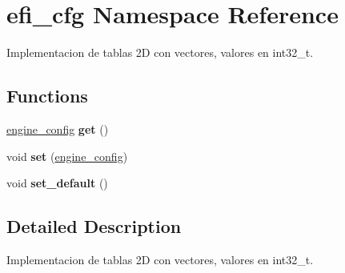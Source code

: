\hypertarget{namespaceefi__cfg}{}\section{efi\+\_\+cfg Namespace Reference}
\label{namespaceefi__cfg}


Implementacion de tablas 2D con vectores, valores en int32\+\_\+t.  


\subsection*{Functions}
\begin{DoxyCompactItemize}
\item 
\mbox{\label{namespaceefi__cfg_a502d3fe510b5a4780770a2ff660c77f2}} 
\hyperlink{structengine__config}{engine\+\_\+config} {\bfseries get} ()
\item 
\mbox{\label{namespaceefi__cfg_aa678d9b2512148be0d49949566418064}} 
void {\bfseries set} (\hyperlink{structengine__config}{engine\+\_\+config})
\item 
\mbox{\label{namespaceefi__cfg_a25e6eca6314adcef17b6a3e862c8c07f}} 
void {\bfseries set\+\_\+default} ()
\end{DoxyCompactItemize}


\subsection{Detailed Description}
Implementacion de tablas 2D con vectores, valores en int32\+\_\+t. 